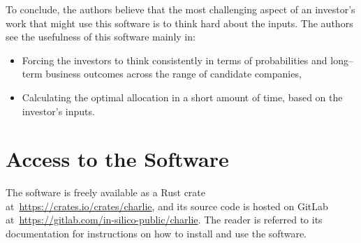 \documentclass{article}
\begin{document}
\indent To conclude, the authors believe that the most challenging aspect of an
investor's work that might use this software is to think hard about the inputs.
The authors see the usefulness of this software mainly in:
\begin{itemize}
    \item Forcing the investors to think consistently in terms of probabilities
    and long--term business outcomes across the range of candidate companies,
    \item Calculating the optimal allocation in a short amount of time, based on
    the investor's inputs.
\end{itemize}

\section{Access to the Software}

\noindent The software is freely available as a Rust crate
at~\url{https://crates.io/crates/charlie}, and its source code is hosted on
GitLab at~\url{https://gitlab.com/in-silico-public/charlie}. The reader is
referred to its documentation for instructions on how to install and use the
software.

\clearpage



\end{document}

